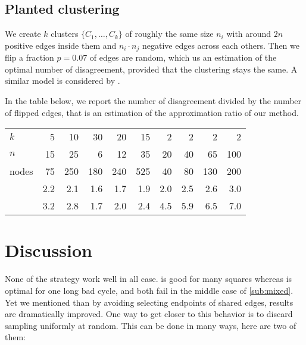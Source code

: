 \subsection{Planted clustering}

We create $k$ clusters $\{C_1, \ldots, C_k\}$ of roughly the same size $n_i$
with around $2n$ positive edges inside them and $n_i\cdot n_j$ negative edges
across each others. Then we flip a fraction $p=0.07$ of edges are random,
which us an estimation of the optimal number of disagreement, provided that
the clustering stays the same. A similar model is considered by
\textcite{Makarychev2014}.

In the table below, we report the number of disagreement divided by the
number of flipped edges, that is an estimation of the approximation ratio of
our method.

\begin{center}
\begin{tabular}{lrrrrrrrrr}
\toprule
$k$      & 5   & 10  & 30  & 20  & 15  & 2   & 2   & 2   & 2  \\
$n$      & 15  & 25  & 6   & 12  & 35  & 20  & 40  & 65  & 100 \\
nodes    & 75  & 250 & 180 & 240 & 525 & 40  & 80  & 130 & 200 \\
\midrule
\pat{}   & 2.2 & 2.1 & 1.6 & 1.7 & 1.9 & 2.0 & 2.5 & 2.6 & 3.0 \\
\pot{}   & 3.2 & 2.8 & 1.7 & 2.0 & 2.4 & 4.5 & 5.9 & 6.5 & 7.0 \\
\bottomrule
\end{tabular}
\end{center}

\section{Discussion}

None of the strategy work well in all case. \pot{} is good for many squares
whereas \pat{} is optimal for one long bad cycle, and both fail in the middle
case of \autoref{sub:mixed}. Yet we mentioned than by avoiding selecting
endpoints of shared edges, results are dramatically improved. One way to get
closer to this behavior is to discard sampling uniformly at random. This can
be done in many ways, here are two of them:

